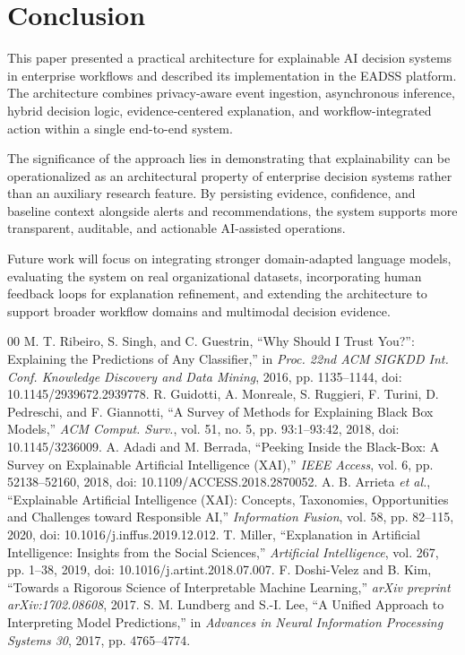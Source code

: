 \documentclass[conference]{IEEEtran}
\begin{document}
\section{Conclusion}
This paper presented a practical architecture for explainable AI decision systems in enterprise workflows and described its implementation in the EADSS platform. The architecture combines privacy-aware event ingestion, asynchronous inference, hybrid decision logic, evidence-centered explanation, and workflow-integrated action within a single end-to-end system.

The significance of the approach lies in demonstrating that explainability can be operationalized as an architectural property of enterprise decision systems rather than an auxiliary research feature. By persisting evidence, confidence, and baseline context alongside alerts and recommendations, the system supports more transparent, auditable, and actionable AI-assisted operations.

Future work will focus on integrating stronger domain-adapted language models, evaluating the system on real organizational datasets, incorporating human feedback loops for explanation refinement, and extending the architecture to support broader workflow domains and multimodal decision evidence.

\begin{thebibliography}{00}
 M. T. Ribeiro, S. Singh, and C. Guestrin, ``Why Should I Trust You?'': Explaining the Predictions of Any Classifier,'' in \textit{Proc. 22nd ACM SIGKDD Int. Conf. Knowledge Discovery and Data Mining}, 2016, pp. 1135--1144, doi: 10.1145/2939672.2939778.
 R. Guidotti, A. Monreale, S. Ruggieri, F. Turini, D. Pedreschi, and F. Giannotti, ``A Survey of Methods for Explaining Black Box Models,'' \textit{ACM Comput. Surv.}, vol. 51, no. 5, pp. 93:1--93:42, 2018, doi: 10.1145/3236009.
 A. Adadi and M. Berrada, ``Peeking Inside the Black-Box: A Survey on Explainable Artificial Intelligence (XAI),'' \textit{IEEE Access}, vol. 6, pp. 52138--52160, 2018, doi: 10.1109/ACCESS.2018.2870052.
 A. B. Arrieta \textit{et al.}, ``Explainable Artificial Intelligence (XAI): Concepts, Taxonomies, Opportunities and Challenges toward Responsible AI,'' \textit{Information Fusion}, vol. 58, pp. 82--115, 2020, doi: 10.1016/j.inffus.2019.12.012.
 T. Miller, ``Explanation in Artificial Intelligence: Insights from the Social Sciences,'' \textit{Artificial Intelligence}, vol. 267, pp. 1--38, 2019, doi: 10.1016/j.artint.2018.07.007.
 F. Doshi-Velez and B. Kim, ``Towards a Rigorous Science of Interpretable Machine Learning,'' \textit{arXiv preprint arXiv:1702.08608}, 2017.
 S. M. Lundberg and S.-I. Lee, ``A Unified Approach to Interpreting Model Predictions,'' in \textit{Advances in Neural Information Processing Systems 30}, 2017, pp. 4765--4774.
\end{thebibliography}
\end{document}
